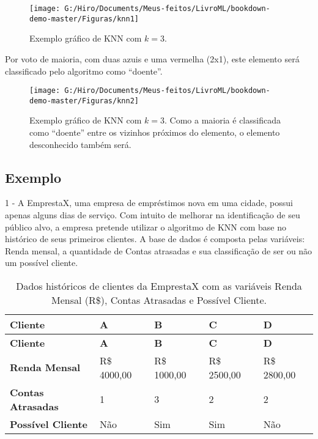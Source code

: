 \documentclass[
  openany]{book}
\begin{document}
\begin{figure}

{\centering \texttt{[image: G:/Hiro/Documents/Meus-feitos/LivroML/bookdown-demo-master/Figuras/knn1]} 

}

\caption{Exemplo gráfico de KNN com \(k=3\).}\label{fig:knn1}
\end{figure}



Por voto de maioria, com duas azuis e uma vermelha (2x1), este elemento será classificado pelo algoritmo como ``doente''.

\begin{figure}

{\centering \texttt{[image: G:/Hiro/Documents/Meus-feitos/LivroML/bookdown-demo-master/Figuras/knn2]} 

}

\caption{Exemplo gráfico de KNN com \(k=3\). Como a maioria é classificada como ``doente'' entre os vizinhos próximos do elemento, o elemento desconhecido também será.}\label{fig:knn2}
\end{figure}



\hypertarget{exknn}{%
\subsection{Exemplo}\label{exknn}}

1 - A EmprestaX, uma empresa de empréstimos nova em uma cidade, possui apenas alguns dias de serviço. Com intuito de melhorar na identificação de seu público alvo, a empresa pretende utilizar o algoritmo de KNN com base no histórico de seus primeiros clientes. A base de dados é composta pelas variáveis: Renda mensal, a quantidade de Contas atrasadas e sua classificação de ser ou não um possível cliente.

\begin{longtable}[]{@{}lllll@{}}
\caption{\label{tab:dadossrendaaknn} Dados históricos de clientes da EmprestaX com as variáveis Renda Mensal (R\$), Contas Atrasadas e Possível Cliente.}\tabularnewline
\toprule
\textbf{Cliente} & \textbf{A} & \textbf{B} & \textbf{C} & \textbf{D}\tabularnewline
\midrule
\endfirsthead
\toprule
\textbf{Cliente} & \textbf{A} & \textbf{B} & \textbf{C} & \textbf{D}\tabularnewline
\midrule
\endhead
\textbf{Renda Mensal} & R\$ 4000,00 & R\$ 1000,00 & R\$ 2500,00 & R\$ 2800,00\tabularnewline
\textbf{Contas Atrasadas} & 1 & 3 & 2 & 2\tabularnewline
\textbf{Possível Cliente} & Não & Sim & Sim & Não\tabularnewline
\bottomrule
\end{longtable}
\end{document}
